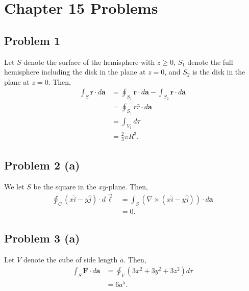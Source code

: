 \documentclass[10pt]{mypackage}
\begin{document}
\RaggedRight
\section{Chapter 15 Problems}%
\subsection{Problem 1}%
Let $S$ denote the surface of the hemisphere with $z\geq 0$, $S_1$ denote the full hemisphere including the disk in the plane at $z=0$, and $S_2$ is the disk in the plane at $z=0$. Then,
\begin{align*}
  \int_{S}^{} \mathbf{r}\cdot d\mathbf{a} &= \oint_{S_1}\mathbf{r}\cdot d\mathbf{a} - \int_{S_2}\mathbf{r}\cdot d\mathbf{a}\\
                                          &= \oint_{S_1}r\hat{r}\cdot d\mathbf{a}\\
                                          &= \int_{V_1}d\tau\\
                                          &= \frac{2}{3}\pi R^3.
\end{align*}
\subsection{Problem 2 (a)}%
We let $S$ be the square in the $xy$-plane. Then,
\begin{align*}
  \oint_{C}\left(x\hat{i} - y\hat{j}\right)\cdot d\vec{\ell} &= \int_{S}\left(\nabla\times \left(x\hat{i} - y\hat{j}\right)\right)\cdot d\mathbf{a}\\
                                                             &= 0.
\end{align*}
\subsection{Problem 3 (a)}%
Let $V$ denote the cube of side length $a$. Then,
\begin{align*}
  \int_{S} \mathbf{F}\cdot d\mathbf{a} &= \oint_{V}\left(3x^2 + 3y^2 + 3z^2\right)d\tau\\
                                       &= 6a^5.
\end{align*}
\end{document}
